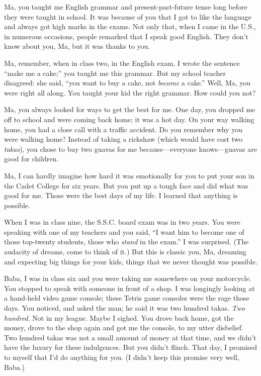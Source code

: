  Ma, you taught me English grammar and present-past-future tense 
 long before they were taught in school. 
 It was because of you that I got to like the language 
 and always got high marks in the exams. 
 Not only that, 
 when I came in the U.S., 
 in numerous occasions, 
 people remarked that I speak good English. 
 They don't know about you, Ma, 
 but it was thanks to you.

 Ma, remember, when in class two, 
 in the English exam, I wrote the sentence 
 ``make me a cake;'' you taught me this grammar. 
 But my school teacher disagreed: 
 she said, ``you want to buy a cake, not \emph{become} a cake.'' 
 Well, Ma, you were right all along. 
 You taught your kid the right grammar. 
 How could you not?

 Ma, you always looked for ways to get the best for me. 
 One day, you dropped me off to school and were coming back home; 
 it was a hot day. 
 On your way walking home, you had a close call with a traffic accident. 
 Do you remember why you were walking home? 
 Instead of taking a rickshaw (which would have cost two \emph{takas}), 
 you chose to buy two guavas for me because---everyone knows---guavas are good for children.


 Ma, I can hardly imagine how hard it was emotionally for you 
 to put your son in the Cadet College for six years. 
 But you put up a tough face and did what was good for me. 
 Those were the best days of my life. 
 I learned that anything is possible. 


 When I was in class nine, 
 the S.S.C. board exam was in two years. 
 You were speaking with one of my teachers 
 and you said, ``I want him to become one of those top-twenty 
 students, those who \emph{stand} in the exam.'' 
 I was surprised. (The audacity of dreams, come to think of it.) 
 But this is classic you, Ma, 
 dreaming and expecting big things for your kids, 
 things that we never thought was possible.

 \vspace{1em}

 Baba, I was in class six and you were taking me somewhere on your motorcycle. 
 You stopped to speak with someone in front of a shop. 
 I was longingly looking at a hand-held video game console; 
 these Tetris game consoles were the rage those days. 
 You noticed, and asked the man; he said it was two hundred takas. 
 \emph{Two hundred}. Not in my league. Maybe I sighed. 
 You drove back home, got the money, drove to the shop again 
 and got me the console, to my utter disbelief. 
 Two hundred takas was not a small amount of money at that time, and we didn't have the luxury for these indulgences.
 But you didn't flinch. 
 That day, I promised to myself that I'd do anything for you. 
 (I didn't keep this promise very well, Baba.)

